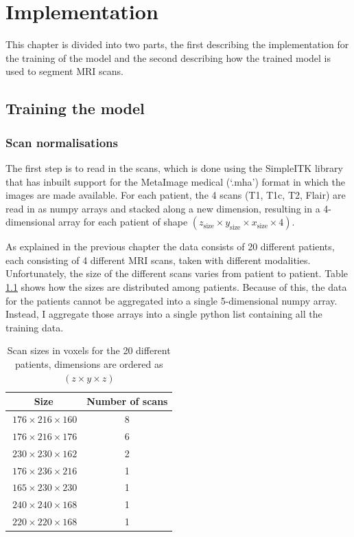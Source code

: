 \documentclass[12pt,a4paper,twoside,openright]{report}
\begin{document}
\chapter{Implementation}
This chapter is divided into two parts, the first describing the implementation for the training of the model and the second describing how the trained model is used to segment MRI scans.

\section{Training the model}
\subsection{Scan normalisations}
\label{section:scan_normalisations}
The first step is to read in the scans, which is done using the SimpleITK library that has inbuilt support for the MetaImage medical (`.mha') format in which the images are made available. For each patient, the 4 scans (T1, T1c, T2, Flair) are read in as numpy arrays and stacked along a new dimension, resulting in a 4-dimensional array for each patient of shape $(z_{\text{size}} \times y_{\text{size}} \times x_{\text{size}} \times 4)$.
 
As explained in the previous chapter the data consists of 20 different patients, each consisting of 4 different MRI scans, taken with different modalities. Unfortunately, the size of the different scans varies from patient to patient. Table \ref{table:scan_sizes} shows how the sizes are distributed among patients. Because of this, the data for the patients cannot be aggregated into a single 5-dimensional numpy array. Instead, I aggregate those arrays into a single python list containing all the training data.

\begin{table}[h]
\centering	
\label{table:scan_sizes}
\begin{tabular}{ c c } 
\textbf{Size} & \textbf{Number of scans}\\
 \hline
 $\ 176 \times 216 \times 160$ & 8 \\ 
 $\ 176 \times 216 \times 176$ & 6 \\ 
 $\ 230 \times 230 \times 162$ & 2 \\ 
 $\ 176 \times 236 \times 216$ & 1 \\ 
 $\ 165 \times 230 \times 230$ & 1 \\ 
 $\ 240 \times 240 \times 168$ & 1 \\ 
 $\ 220 \times 220 \times 168$ & 1 \\ 

\end{tabular}
\caption{Scan sizes in voxels for the 20 different patients, dimensions are ordered as $(z \times y \times z)$}
\end{table}
\end{document}
